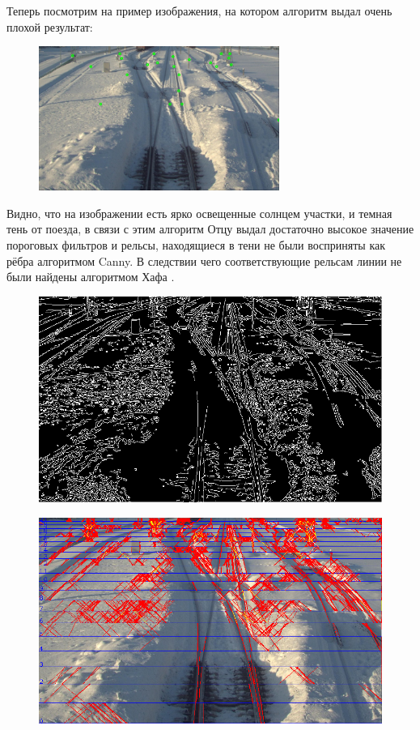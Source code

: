 Теперь посмотрим на пример изображения, на котором алгоритм выдал очень плохой результат:
\begin{figure}[!h]
	\centering
	\includegraphics[width=0.7\textwidth]{pictures/bad_ex.png}
	\caption{}
	\label{fig:res4}
\end{figure}
\newpage
Видно, что на изображении есть ярко освещенные солнцем участки, и темная тень от поезда, в связи с этим алгоритм Отцу \cite{b:otsu} выдал достаточно высокое значение пороговых фильтров и рельсы, находящиеся в тени не были восприняты как рёбра алгоритмом Canny\cite{b:canny}. В следствии чего соответствующие рельсам линии не были найдены алгоритмом Хафа \cite{b:hough_transform}.
\begin{figure}[!h]
	\centering
	\includegraphics[width=0.7\linewidth]{pictures/bad_canny.png}
	\caption[Y - обратное]{}
	\label{fig:bad_canny}
\end{figure}
\begin{figure}[!h]
	\centering
	\includegraphics[width=0.7\linewidth]{pictures/bad_lines.png}
	\caption[Y - обратное]{}
	\label{fig:bad_lines}
\end{figure}
\newpage
